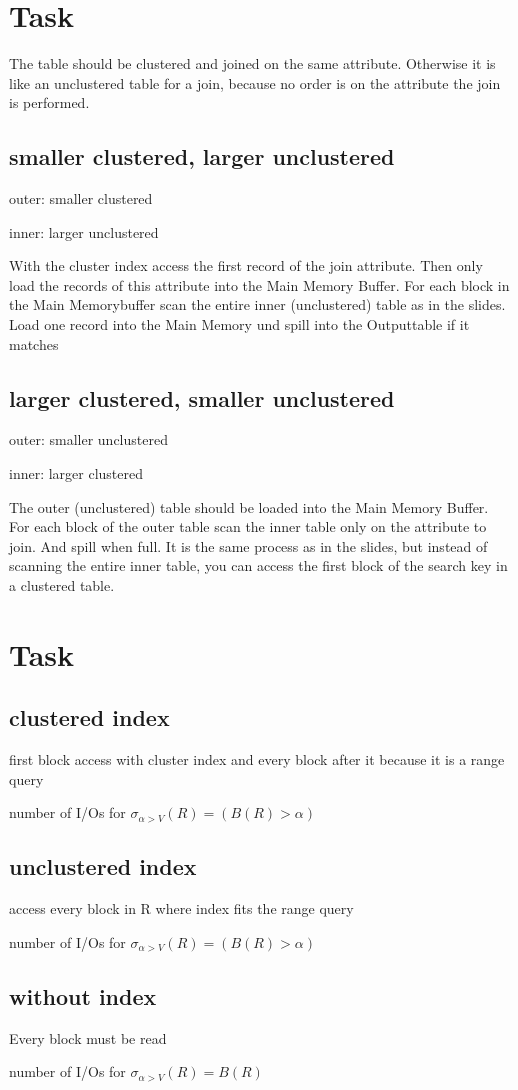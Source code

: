 \documentclass{article}
\begin{document}
\section{Task}
    The table should be clustered and joined on the same attribute. 
    Otherwise it is like an unclustered table for a join, because no order is on the attribute the join is performed.
    \subsection{smaller clustered, larger unclustered}
        outer: smaller clustered

        inner: larger unclustered

        With the cluster index access the first record of the join attribute. 
        Then only load the records of this attribute into the Main Memory Buffer.
        For each block in the Main Memorybuffer scan the entire inner (unclustered) table as in the slides. 
        Load one record into the Main Memory und spill into the Outputtable if it matches
    \subsection{larger clustered, smaller unclustered}
        outer: smaller unclustered 

        inner: larger clustered
        
        The outer (unclustered) table should be loaded into the Main Memory Buffer. 
        For each block of the outer table scan the inner table only on the attribute to join. 
        And spill when full. It is the same process as in the slides, but instead of scanning the entire inner table, 
        you can access the first block of the search key in a clustered table.

\section{Task}
    \subsection{clustered index}
        first block access with cluster index and every block after it because it is a range query

        number of I/Os for $\sigma_{\alpha>V}(R) = (B(R)>\alpha)$ 
    \subsection{unclustered index}
        access every block in R where index fits the range query

        number of I/Os for $\sigma_{\alpha>V}(R) = (B(R) > \alpha)$
    \subsection{without index}
        Every block must be read

        number of I/Os for $\sigma_{\alpha>V}(R) = B(R)$    
\end{document}
